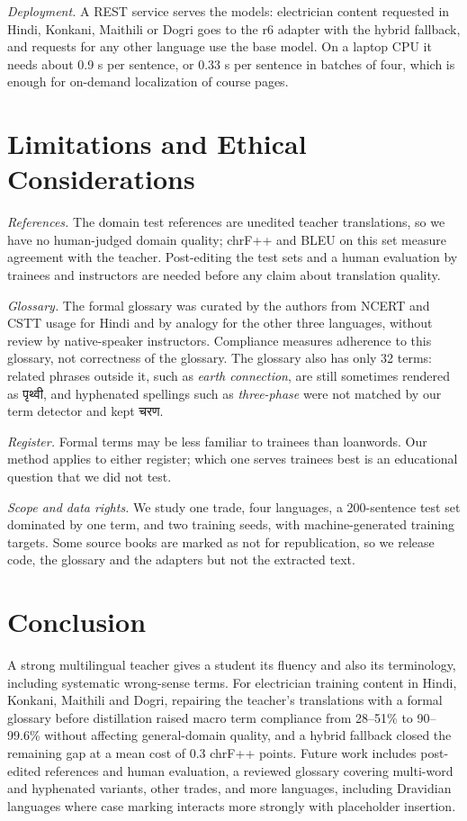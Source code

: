 \documentclass[conference]{IEEEtran}
\newcommand{\dev}[1]{{\devfont #1}}
\begin{document}
\emph{Deployment.} A REST service serves the models: electrician content requested in Hindi, Konkani, Maithili or Dogri goes to the r6 adapter with the hybrid fallback, and requests for any other language use the base model. On a laptop CPU it needs about 0.9 s per sentence, or 0.33 s per sentence in batches of four, which is enough for on-demand localization of course pages.

\section{Limitations and Ethical Considerations}
\label{sec:limitations}

\emph{References.} The domain test references are unedited teacher translations, so we have no human-judged domain quality; chrF++ and BLEU on this set measure agreement with the teacher. Post-editing the test sets and a human evaluation by trainees and instructors are needed before any claim about translation quality.

\emph{Glossary.} The formal glossary was curated by the authors from NCERT and CSTT usage for Hindi and by analogy for the other three languages, without review by native-speaker instructors. Compliance measures adherence to this glossary, not correctness of the glossary. The glossary also has only 32 terms: related phrases outside it, such as \emph{earth connection}, are still sometimes rendered as \dev{पृथ्वी}, and hyphenated spellings such as \emph{three-phase} were not matched by our term detector and kept \dev{चरण}.

\emph{Register.} Formal terms may be less familiar to trainees than loanwords. Our method applies to either register; which one serves trainees best is an educational question that we did not test.

\emph{Scope and data rights.} We study one trade, four languages, a 200-sentence test set dominated by one term, and two training seeds, with machine-generated training targets. Some source books are marked as not for republication, so we release code, the glossary and the adapters but not the extracted text.

\section{Conclusion}

A strong multilingual teacher gives a student its fluency and also its terminology, including systematic wrong-sense terms. For electrician training content in Hindi, Konkani, Maithili and Dogri, repairing the teacher's translations with a formal glossary before distillation raised macro term compliance from 28--51\% to 90--99.6\% without affecting general-domain quality, and a hybrid fallback closed the remaining gap at a mean cost of 0.3 chrF++ points. Future work includes post-edited references and human evaluation, a reviewed glossary covering multi-word and hyphenated variants, other trades, and more languages, including Dravidian languages where case marking interacts more strongly with placeholder insertion.
\end{document}
